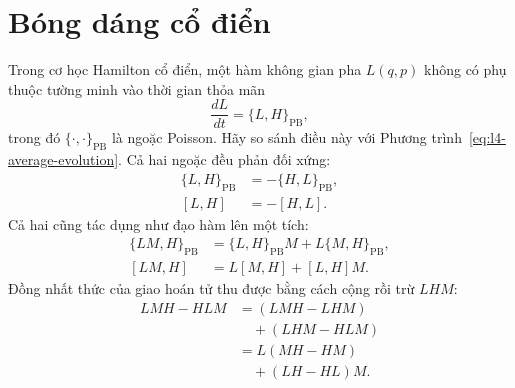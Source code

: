 \begin{classroomqa}
\end{classroomqa}

\begin{classroomqa}
\end{classroomqa}

\section{Bóng dáng cổ điển}

Trong cơ học Hamilton cổ điển, một hàm không gian pha \(L(q,p)\) không có phụ thuộc tường minh vào thời gian thỏa mãn
\begin{equation}
\frac{dL}{dt}=\{L,H\}_{\mathrm{PB}},
\label{eq:l4-poisson-evolution}
\end{equation}
trong đó \(\{\cdot,\cdot\}_{\mathrm{PB}}\) là ngoặc Poisson. Hãy so sánh điều này với Phương trình~\eqref{eq:l4-average-evolution}. Cả hai ngoặc đều phản đối xứng:
\begin{align}
\{L,H\}_{\mathrm{PB}}&=-\{H,L\}_{\mathrm{PB}},\\
[L,H]&=-[H,L].
\end{align}
Cả hai cũng tác dụng như đạo hàm lên một tích:
\begin{align}
\{LM,H\}_{\mathrm{PB}}
&=\{L,H\}_{\mathrm{PB}}M+L\{M,H\}_{\mathrm{PB}},\\
[LM,H]
&=L[M,H]+[L,H]M.
\label{eq:l4-commutator-product}
\end{align}
Đồng nhất thức của giao hoán tử thu được bằng cách cộng rồi trừ \(LHM\):
\begin{align}
LMH-HLM
&=(LMH-LHM)\\
&\quad +(LHM-HLM)\\
&=L(MH-HM)\\
&\quad +(LH-HL)M.
\end{align}

